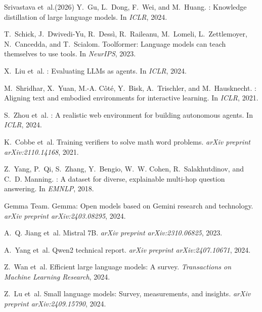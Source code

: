 \documentclass{article}
\begin{document}
\begin{thebibliography}{Srivastava et~al.(2026)}
Y.~Gu, L.~Dong, F.~Wei, and M.~Huang.
: Knowledge distillation of large language models.
\newblock In \emph{ICLR}, 2024.

T.~Schick, J.~Dwivedi-Yu, R.~Dess{\`i}, R.~Raileanu, M.~Lomeli,
  L.~Zettlemoyer, N.~Cancedda, and T.~Scialom.
\newblock Toolformer: Language models can teach themselves to use tools.
\newblock In \emph{NeurIPS}, 2023.

X.~Liu et~al.
: Evaluating {LLM}s as agents.
\newblock In \emph{ICLR}, 2024.

M.~Shridhar, X.~Yuan, M.-A. C{\^o}t{\'e}, Y.~Bisk, A.~Trischler, and
  M.~Hausknecht.
: Aligning text and embodied environments for
  interactive learning.
\newblock In \emph{ICLR}, 2021.

S.~Zhou et~al.
: A realistic web environment for building autonomous
  agents.
\newblock In \emph{ICLR}, 2024.

K.~Cobbe et~al.
\newblock Training verifiers to solve math word problems.
\newblock \emph{arXiv preprint arXiv:2110.14168}, 2021.

Z.~Yang, P.~Qi, S.~Zhang, Y.~Bengio, W.~W. Cohen, R.~Salakhutdinov, and
  C.~D. Manning.
: A dataset for diverse, explainable multi-hop
  question answering.
\newblock In \emph{EMNLP}, 2018.

Gemma Team.
\newblock Gemma: Open models based on {Gemini} research and technology.
\newblock \emph{arXiv preprint arXiv:2403.08295}, 2024.

A.~Q. Jiang et~al.
\newblock Mistral 7{B}.
\newblock \emph{arXiv preprint arXiv:2310.06825}, 2023.

A.~Yang et~al.
\newblock Qwen2 technical report.
\newblock \emph{arXiv preprint arXiv:2407.10671}, 2024.

Z.~Wan et~al.
\newblock Efficient large language models: A survey.
\newblock \emph{Transactions on Machine Learning Research}, 2024.

Z.~Lu et~al.
\newblock Small language models: Survey, measurements, and insights.
\newblock \emph{arXiv preprint arXiv:2409.15790}, 2024.

\end{thebibliography}

\newpage

\end{document}

